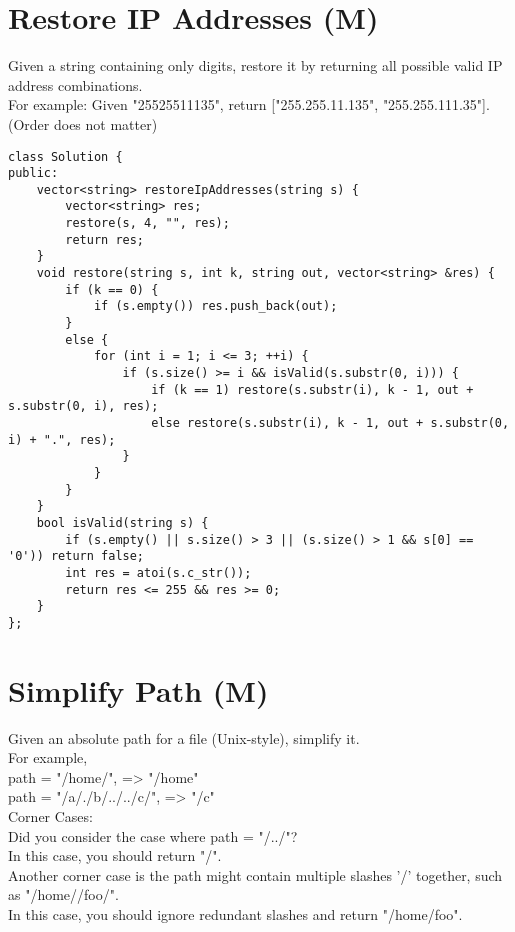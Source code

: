 \section{Restore IP Addresses (M)}
Given a string containing only digits, restore it by returning all possible valid IP address combinations.\\

For example:
Given "25525511135",
return ["255.255.11.135", "255.255.111.35"]. (Order does not matter) \\

\begin{lstlisting}
class Solution {
public:
    vector<string> restoreIpAddresses(string s) {
        vector<string> res;
        restore(s, 4, "", res);
        return res;
    }
    void restore(string s, int k, string out, vector<string> &res) {
        if (k == 0) {
            if (s.empty()) res.push_back(out);
        }
        else {
            for (int i = 1; i <= 3; ++i) {
                if (s.size() >= i && isValid(s.substr(0, i))) {
                    if (k == 1) restore(s.substr(i), k - 1, out + s.substr(0, i), res);
                    else restore(s.substr(i), k - 1, out + s.substr(0, i) + ".", res);
                }
            }
        }
    }
    bool isValid(string s) {
        if (s.empty() || s.size() > 3 || (s.size() > 1 && s[0] == '0')) return false;
        int res = atoi(s.c_str());
        return res <= 255 && res >= 0;
    }
};
\end{lstlisting}


\section{Simplify Path (M)}
Given an absolute path for a file (Unix-style), simplify it.\\

For example,\\
path = "/home/", => "/home"\\
path = "/a/./b/../../c/", => "/c"\\

Corner Cases:\\
    Did you consider the case where path = "/../"?\\
    In this case, you should return "/".\\
    Another corner case is the path might contain multiple slashes '/' together, such as "/home//foo/".\\
    In this case, you should ignore redundant slashes and return "/home/foo".\\
    
